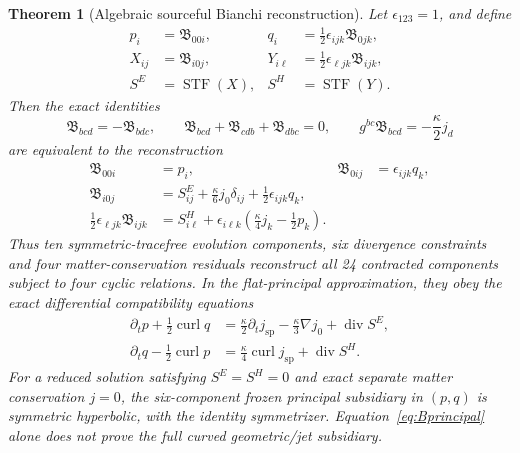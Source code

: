 \documentclass[11pt,a4paper]{article}
\newtheorem{theorem}{Theorem}[section]
\newcommand{\STF}{\operatorname{STF}}
\newcommand{\diver}{\operatorname{div}}
\newcommand{\curl}{\operatorname{curl}}
\newcommand{\kap}{\kappa}
\begin{document}
\begin{theorem}[Algebraic sourceful Bianchi reconstruction]\label{thm:B24}
Let $\epsilon_{123}=1$, and define
\begin{align*}
p_i&=\mathfrak B_{00i},&q_i&=\tfrac12\epsilon_{ijk}\mathfrak B_{0jk},\\
X_{ij}&=\mathfrak B_{i0j},&Y_{i\ell}&=\tfrac12\epsilon_{\ell jk}\mathfrak B_{ijk},\\
S^E&=\STF(X),&S^H&=\STF(Y).
\end{align*}
Then the exact identities
\begin{equation}\label{eq:Bcyctrace}
\mathfrak B_{bcd}=-\mathfrak B_{bdc},\qquad
\mathfrak B_{bcd}+\mathfrak B_{cdb}+\mathfrak B_{dbc}=0,\qquad
g^{bc}\mathfrak B_{bcd}=-\frac\kap2 j_d
\end{equation}
are equivalent to the reconstruction
\begin{equation}\label{eq:Breconstruct}
\boxed{\begin{aligned}
\mathfrak B_{00i}&=p_i,&\mathfrak B_{0ij}&=\epsilon_{ijk}q_k,\\
\mathfrak B_{i0j}&=S^E_{ij}+\frac{\kap}{6}j_0\delta_{ij}
 +\frac12\epsilon_{ijk}q_k,\\
\frac12\epsilon_{\ell jk}\mathfrak B_{ijk}
&=S^H_{i\ell}+\epsilon_{i\ell k}\left(\frac\kap4j_k-\frac12p_k\right).
\end{aligned}}\end{equation}
Thus ten symmetric-tracefree evolution components, six divergence constraints and four matter-conservation residuals reconstruct all 24 contracted components subject to four cyclic relations. In the flat-principal approximation, they obey the exact differential compatibility equations
\begin{equation}\label{eq:Bprincipal}
\boxed{\begin{aligned}
\partial_t p+\tfrac12\curl q&=\frac\kap2\partial_t j_{\mathrm{sp}}
 -\frac\kap3\nabla j_0+\diver S^E,\\
\partial_t q-\tfrac12\curl p&=\frac\kap4\curl j_{\mathrm{sp}}
 +\diver S^H.
\end{aligned}}
\end{equation}
For a reduced solution satisfying $S^E=S^H=0$ and exact separate matter conservation $j=0$, the six-component frozen principal subsidiary in $(p,q)$ is symmetric hyperbolic, with the identity symmetrizer. Equation~\eqref{eq:Bprincipal} alone does not prove the full curved geometric/jet subsidiary.
\end{theorem}
\end{document}
